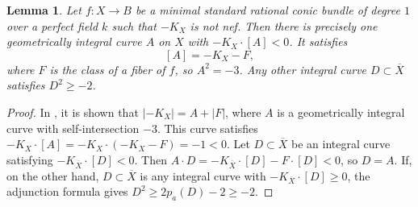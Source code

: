 \documentclass[a4paper, 11pt, reqno]{amsart}
\numberwithin{equation}{section} \numberwithin{figure}{section}
\newcommand{\ra}{\rightarrow}
\newtheorem{lemma}{Lemma}
\theoremstyle{definition}
\numberwithin{lemma}{section}
\begin{document}
    \begin{lemma}\label{lem:-KXnotnef}
    Let $f \colon X \ra B$ be a minimal standard rational conic bundle of degree $1$ over a perfect field $k$ such that $-K_X$ is not nef. Then there is precisely one geometrically integral curve $A$ on $X$ with $-K_X \cdot [A] < 0$. It satisfies \[[A] = -K_X - F,\] where $F$ is the class of a fiber of $f$, so $A^2 = -3$. Any other integral curve $D \subset \overline{X}$ satisfies $D^2 \geq -2$. 
\end{lemma}

\begin{proof}
    In \cite[Lemma 19]{kollarmella}, it is shown that $|-K_X| = A + |F|$, where $A$ is a geometrically integral curve with self-intersection $-3$. This curve satisfies $-K_X \cdot [A] = -K_X \cdot (-K_X - F) = -1 < 0$. 
    Let  $D \subset \overline{X}$ be an integral curve satisfying $-K_{\overline{X}} \cdot [D] < 0$. Then $A \cdot D = -K_{\overline{X}} \cdot [D] - F \cdot [D] < 0$, so $D = A$. If, on the other hand, $D \subset \overline{X}$ is any integral curve with $-K_{\overline{X}} \cdot [D] \geq 0$, the adjunction formula gives $D^2 \geq 2p_a(D) - 2 \geq -2$.
\end{proof}
   

\end{document}
